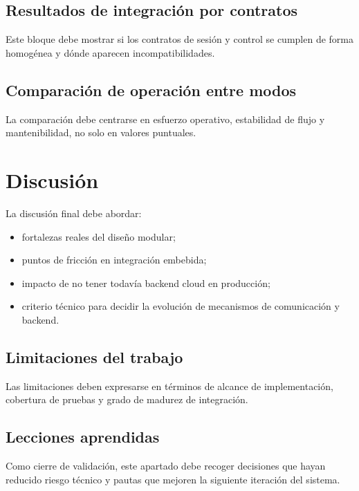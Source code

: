 \label{fig:placeholder-resultado-comunicacion}

\subsection{Resultados de integración por contratos}

Este bloque debe mostrar si los contratos de sesión y control se cumplen de forma homogénea y dónde aparecen incompatibilidades.

\label{fig:placeholder-resultado-espectral}

\subsection{Comparación de operación entre modos}

La comparación debe centrarse en esfuerzo operativo, estabilidad de flujo y mantenibilidad, no solo en valores puntuales.

\label{fig:placeholder-comparacion-final}

\section{Discusión}

La discusión final debe abordar:

\begin{itemize}
  \item fortalezas reales del diseño modular;
  \item puntos de fricción en integración embebida;
  \item impacto de no tener todavía backend cloud en producción;
  \item criterio técnico para decidir la evolución de mecanismos de comunicación y backend.
\end{itemize}

\subsection{Limitaciones del trabajo}

Las limitaciones deben expresarse en términos de alcance de implementación, cobertura de pruebas y grado de madurez de integración.

\subsection{Lecciones aprendidas}

Como cierre de validación, este apartado debe recoger decisiones que hayan reducido riesgo técnico y pautas que mejoren la siguiente iteración del sistema.
